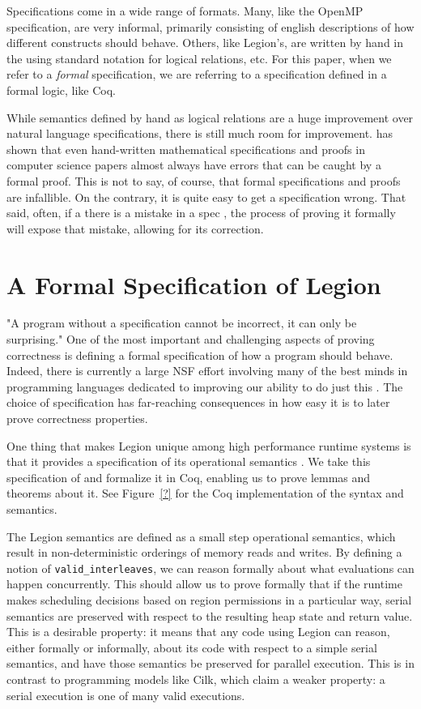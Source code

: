 \documentclass[sigplan]{acmart}
\begin{document}
Specifications come in a wide range of formats. Many, like the OpenMP
specification, are very informal, primarily consisting of english descriptions
of how different constructs should behave. Others, like Legion's, are written
by hand in the using standard notation for logical relations, etc. For this
paper, when we refer to a \emph{formal} specification, we are referring to a
specification defined in a formal logic, like Coq. 

While semantics defined by hand as logical relations are a huge improvement
over natural language specifications, there is still much room for improvement.
\cite{formalspec vs paper} has shown that even hand-written mathematical
specifications and proofs in computer science papers almost always have errors
that can be caught by a formal proof.  This is not to say, of course, that
formal specifications and proofs are infallible.  On the contrary, it is quite
easy to get a specification wrong.  That said, often, if a there is a mistake
in a spec , the process of proving it formally will expose that mistake,
allowing for its correction. 

\section{A Formal Specification of Legion}

"A program without a specification cannot be incorrect, it can only be
surprising." \cite{appel} One of the most important and challenging aspects of
proving correctness is defining a formal specification of how a program
should behave. Indeed, there is currently a large NSF effort involving many of
the best minds in programming languages dedicated to improving our ability to
do just this \cite{deepspec}. The choice of specification has far-reaching
consequences in how easy it is to later prove correctness properties.

One thing that makes Legion unique among high performance runtime systems is
that it provides a specification of its operational semantics \cite{oopsla13}.
We take this specification of and formalize it in Coq, enabling us to prove
lemmas and theorems about it. See Figure~\ref{?} for the Coq implementation of the
syntax and semantics.

The Legion semantics are defined as a small step operational semantics, which
result in non-deterministic orderings of memory reads and writes. By defining a
notion of \texttt{valid\_interleaves}, we can reason formally about what evaluations 
can happen concurrently. This should allow us to prove formally that if the
runtime makes scheduling decisions based on region permissions in a particular
way, serial semantics are preserved with respect to the resulting heap state
and return value. This is a desirable property: it means that any code using
Legion can reason, either formally or informally, about its code with respect
to a simple serial semantics, and have those semantics be preserved for
parallel execution. This is in contrast to programming models like Cilk, which
claim a weaker property: a serial execution is one of many valid executions. 
\end{document}
